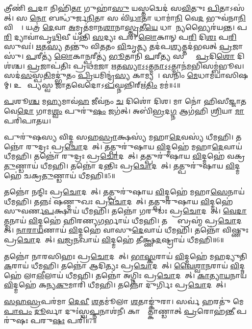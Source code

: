 𑌤𑍍𑌰𑍀𑌣𑌿॑ \ul{𑌪}𑌦𑌾 𑌨𑌿𑌹𑌿॑\ul{𑌤𑌾} 𑌗𑍁𑌹𑌾॑\ul{𑌸𑍁} 𑌯𑌸𑍍𑌤𑌦𑍍𑌵𑍇𑌦॑ 𑌸\ul{𑌵𑌿}𑌤𑍁𑌃 \ul{𑌪𑌿}𑌤𑌾𑌽𑌸॑𑌤𑍍। 
𑌸 \ul{𑌨𑍋} 𑌬𑌨𑍍𑌧𑍁॑𑌰𑍍𑌜\ul{𑌨𑌿}𑌤𑌾 𑌸 𑌵𑌿॑\ul{𑌧𑌾}𑌤𑌾 𑌧𑌾𑌮𑌾॑\ul{𑌨𑌿} 𑌵𑍇\ul{𑌦} 𑌭𑍁𑌵॑𑌨𑌾\ul{𑌨𑌿} 𑌵𑌿𑌶𑍍𑌵𑌾᳚। 
𑌯𑌤𑍍𑌰॑ \ul{𑌦𑍇}𑌵𑌾 \ul{𑌅}𑌮𑍃𑌤॑𑌮𑌾𑌨\ul{𑌶𑌾}𑌨𑌾\ul{𑌸𑍍𑌤𑍃}𑌤𑍀\ul{𑌯𑍇} 𑌧𑌾𑌮𑌾᳚\ul{𑌨𑍍𑌯}𑌭𑍍𑌯𑍈𑌰॑𑌯𑌨𑍍𑌤। 
𑌪\ul{𑌰𑌿} 𑌦𑍍𑌯𑌾𑌵𑌾॑𑌪𑍃\ul{𑌥𑌿}𑌵𑍀 𑌯॑𑌨𑍍𑌤𑌿 \ul{𑌸}𑌦𑍍𑌯𑌃 𑌪𑌰𑌿॑ \ul{𑌲𑍋}𑌕𑌾𑌨𑍍 𑌪\ul{𑌰𑌿} 𑌦𑌿\ul{𑌶𑌃} 𑌪\ul{𑌰𑌿} 𑌸𑍁𑌵𑌃॑। 
\ul{𑌋}𑌤\ul{𑌸𑍍𑌯} 𑌤𑌨𑍍𑌤𑍁𑌂॑ 𑌵𑌿𑌤𑌤𑌂 \ul{𑌵𑌿}𑌚𑍃\ul{𑌤𑍍𑌯} 𑌤𑌦॑𑌪\ul{𑌶𑍍𑌯}𑌤𑍍𑌤𑌦॑𑌭𑌵𑌤𑍍 \ul{𑌪𑍍𑌰}𑌜𑌾𑌸𑍁॑। 
\ul{𑌪}𑌰𑍀𑌤𑍍𑌯॑ \ul{𑌲𑍋}𑌕𑌾\ul{𑌨𑍍𑌪}𑌰𑍀𑌤𑍍𑌯॑ \ul{𑌭𑍂}𑌤𑌾𑌨𑌿॑ \ul{𑌪}𑌰𑍀\ul{𑌤𑍍𑌯} 𑌸𑌰𑍍𑌵𑌾𑌃᳚ \ul{𑌪𑍍𑌰}𑌦𑌿\ul{𑌶𑍋} 𑌦𑌿𑌶॑𑌶𑍍𑌚। 
\ul{𑌪𑍍𑌰}𑌜𑌾𑌪॑𑌤𑌿𑌃 𑌪𑍍𑌰𑌥\ul{𑌮}𑌜𑌾 \ul{𑌋}𑌤\ul{𑌸𑍍𑌯𑌾}𑌽॒𑌽॒𑌤𑍍𑌮\ul{𑌨𑌾}𑌽॒𑌽॒𑌤𑍍𑌮𑌾𑌨॑\ul{𑌮}𑌭𑌿𑌸𑌮𑍍𑌬॑𑌭𑍂𑌵। 
𑌸𑌦॑\ul{𑌸}𑌸𑍍𑌪\ul{𑌤𑌿}𑌮𑌦𑍍𑌭𑍁॑𑌤𑌂 \ul{𑌪𑍍𑌰𑌿}𑌯𑌮𑌿𑌨𑍍𑌦𑍍𑌰॑\ul{𑌸𑍍𑌯} 𑌕𑌾𑌮𑍍𑌯𑌮𑍍᳚। 
𑌸𑌨𑌿𑌂॑ \ul{𑌮𑍇}𑌧𑌾𑌮॑𑌯𑌾𑌸𑌿𑌷𑌮𑍍। 
𑌉𑌦𑍍𑌦𑍀᳚𑌪𑍍𑌯𑌸𑍍𑌵 𑌜𑌾𑌤𑌵𑍇𑌦𑍋𑌽\ul{𑌪}𑌘𑍍𑌨𑌨𑍍𑌨𑌿𑌰𑍍\mbox{}𑌋॑\ul{𑌤𑌿𑌂} 𑌮𑌮॑॥4॥

\ul{𑌪}𑌶𑍂\ul{𑌶𑍍𑌚} 𑌮\ul{𑌹𑍍𑌯}𑌮𑌾𑌵॑\ul{𑌹} 𑌜𑍀𑌵॑𑌨𑌂 \ul{𑌚} 𑌦𑌿𑌶𑍋॑ 𑌦𑌿𑌶। 
𑌮𑌾 𑌨𑍋॑ 𑌹𑌿𑌸𑍀𑌜𑍍𑌜𑌾𑌤𑌵𑍇\ul{𑌦𑍋} 𑌗𑌾𑌮\ul{𑌶𑍍𑌵𑌂} 𑌪𑍁𑌰𑍁॑\ul{𑌷𑌂} 𑌜𑌗॑𑌤𑍍। 
𑌅𑌬𑌿॑\ul{𑌭𑍍𑌰}𑌦\ul{𑌗𑍍𑌨} 𑌆𑌗॑𑌹𑌿 \ul{𑌶𑍍𑌰𑌿}𑌯𑌾 \ul{𑌮𑌾} 𑌪𑌰𑌿॑𑌪𑌾𑌤𑌯।


 𑌪𑍁𑌰𑍁॑𑌷𑌸𑍍𑌯 𑌵𑌿𑌦𑍍𑌮 𑌸𑌹\ul{𑌸𑍍𑌰𑌾}𑌕𑍍𑌷𑌸𑍍𑌯॑ 𑌮𑌹𑌾\ul{𑌦𑍇}𑌵𑌸𑍍𑌯॑ 𑌧𑍀𑌮𑌹𑌿। 
 𑌤𑌨𑍍𑌨𑍋॑ 𑌰𑍁𑌦𑍍𑌰𑌃 𑌪𑍍𑌰\ul{𑌚𑍋}𑌦𑌯𑌾᳚𑌤𑍍। 
 𑌤𑌤𑍍𑌪𑍁𑌰𑍁॑𑌷𑌾𑌯 \ul{𑌵𑌿}𑌦𑍍𑌮𑌹𑍇॑ 𑌮𑌹𑌾\ul{𑌦𑍇}𑌵𑌾𑌯॑ 𑌧𑍀𑌮𑌹𑌿। 
 𑌤𑌨𑍍𑌨𑍋॑ 𑌰𑍁𑌦𑍍𑌰𑌃 𑌪𑍍𑌰\ul{𑌚𑍋}𑌦𑌯𑌾᳚𑌤𑍍। 
 𑌤𑌤𑍍𑌪𑍁𑌰𑍁॑𑌷𑌾𑌯 \ul{𑌵𑌿}𑌦𑍍𑌮𑌹𑍇॑ 𑌵𑌕𑍍𑌰\ul{𑌤𑍁}𑌣𑍍𑌡𑌾𑌯॑ 𑌧𑍀𑌮𑌹𑌿। 
 𑌤𑌨𑍍𑌨𑍋॑ 𑌦𑌨𑍍𑌤𑌿𑌃 𑌪𑍍𑌰\ul{𑌚𑍋}𑌦𑌯𑌾᳚𑌤𑍍। 
 𑌤𑌤𑍍𑌪𑍁𑌰𑍁॑𑌷𑌾𑌯 \ul{𑌵𑌿}𑌦𑍍𑌮𑌹𑍇॑ 𑌚𑌕𑍍𑌰\ul{𑌤𑍁}𑌣𑍍𑌡𑌾𑌯॑ 𑌧𑍀𑌮𑌹𑌿॥5॥

 𑌤𑌨𑍍𑌨𑍋॑ 𑌨𑌨𑍍𑌦𑌿𑌃 𑌪𑍍𑌰\ul{𑌚𑍋}𑌦𑌯𑌾᳚𑌤𑍍। 
 𑌤𑌤𑍍𑌪𑍁𑌰𑍁॑𑌷𑌾𑌯 \ul{𑌵𑌿}𑌦𑍍𑌮𑌹𑍇॑ 𑌮𑌹𑌾\ul{𑌸𑍇}𑌨𑌾𑌯॑ 𑌧𑍀𑌮𑌹𑌿। 
 𑌤𑌨𑍍𑌨𑌃॑ 𑌷𑌣𑍍𑌮𑍁𑌖𑌃 𑌪𑍍𑌰\ul{𑌚𑍋}𑌦𑌯𑌾᳚𑌤𑍍। 
 𑌤𑌤𑍍𑌪𑍁𑌰𑍁॑𑌷𑌾𑌯 \ul{𑌵𑌿}𑌦𑍍𑌮𑌹𑍇॑ 𑌸𑍁𑌵𑌰𑍍𑌣\ul{𑌪}𑌕𑍍𑌷𑌾𑌯॑ 𑌧𑍀𑌮𑌹𑌿। 
 𑌤𑌨𑍍𑌨𑍋॑ 𑌗𑌰𑍁𑌡𑌃 𑌪𑍍𑌰\ul{𑌚𑍋}𑌦𑌯𑌾᳚𑌤𑍍। 
 \ul{𑌵𑍇}\ul{𑌦𑌾}\ul{𑌤𑍍𑌮}𑌨𑌾𑌯॑ \ul{𑌵𑌿}𑌦𑍍𑌮𑌹𑍇॑ 𑌹𑌿𑌰𑌣𑍍𑌯\ul{𑌗}𑌰𑍍𑌭𑌾𑌯॑ 𑌧𑍀𑌮𑌹𑌿। 
 𑌤𑌨𑍍𑌨𑍋᳚ 𑌬𑍍𑌰𑌹𑍍𑌮॑ 𑌪𑍍𑌰\ul{𑌚𑍋}𑌦𑌯𑌾᳚𑌤𑍍। 
 \ul{𑌨𑌾}\ul{𑌰𑌾}\ul{𑌯}𑌣𑌾𑌯॑ \ul{𑌵𑌿}𑌦𑍍𑌮𑌹𑍇॑ 𑌵𑌾𑌸𑍁\ul{𑌦𑍇}𑌵𑌾𑌯॑ 𑌧𑍀𑌮𑌹𑌿। 
 𑌤𑌨𑍍𑌨𑍋॑ 𑌵𑌿𑌷𑍍𑌣𑍁𑌃 𑌪𑍍𑌰\ul{𑌚𑍋}𑌦𑌯𑌾᳚𑌤𑍍। 
 \ul{𑌵}\ul{𑌜𑍍𑌰}\ul{𑌨}𑌖𑌾𑌯॑ \ul{𑌵𑌿}𑌦𑍍𑌮𑌹𑍇॑ 𑌤𑍀𑌕𑍍𑌷𑍍𑌣\ul{𑌦}\ul{}𑌷𑍍𑌟𑍍𑌰𑌾𑌯॑ 𑌧𑍀𑌮𑌹𑌿॥6॥
 
𑌤𑌨𑍍𑌨𑍋॑ 𑌨𑌾𑌰𑌸𑌿𑌹𑌃 𑌪𑍍𑌰\ul{𑌚𑍋}𑌦𑌯𑌾᳚𑌤𑍍। 
\ul{𑌭𑌾}\ul{𑌸𑍍𑌕}𑌰𑌾𑌯॑ \ul{𑌵𑌿}𑌦𑍍𑌮𑌹𑍇॑ 𑌮𑌹𑌦𑍍𑌯𑍁𑌤𑌿\ul{𑌕}𑌰𑌾𑌯॑ 𑌧𑍀𑌮𑌹𑌿। 
𑌤𑌨𑍍𑌨𑍋॑ 𑌆𑌦𑌿𑌤𑍍𑌯𑌃 𑌪𑍍𑌰\ul{𑌚𑍋}𑌦𑌯𑌾᳚𑌤𑍍। 
\ul{𑌵𑍈}\ul{𑌶𑍍𑌵𑌾}\ul{𑌨}𑌰𑌾𑌯॑ \ul{𑌵𑌿}𑌦𑍍𑌮𑌹𑍇॑ 𑌲𑌾\ul{𑌲𑍀}𑌲𑌾𑌯॑ 𑌧𑍀𑌮𑌹𑌿। 
𑌤𑌨𑍍𑌨𑍋॑ 𑌅𑌗𑍍𑌨𑌿𑌃 𑌪𑍍𑌰\ul{𑌚𑍋}𑌦𑌯𑌾᳚𑌤𑍍। 
\ul{𑌕𑌾}\ul{𑌤𑍍𑌯𑌾}\ul{𑌯}𑌨𑌾𑌯॑ \ul{𑌵𑌿}𑌦𑍍𑌮𑌹𑍇॑ 𑌕𑌨𑍍𑌯\ul{𑌕𑍁}𑌮𑌾𑌰𑌿॑ 𑌧𑍀𑌮𑌹𑌿। 
𑌤𑌨𑍍𑌨𑍋॑ 𑌦𑍁𑌰𑍍𑌗𑌿𑌃 𑌪𑍍𑌰\ul{𑌚𑍋}𑌦𑌯𑌾᳚𑌤𑍍। 


\ul{𑌸}\ul{𑌹}\ul{𑌸𑍍𑌰}𑌪𑌰॑𑌮𑌾 \ul{𑌦𑍇}\ul{𑌵𑍀} \ul{𑌶}𑌤𑌮𑍂॑𑌲𑌾 \ul{𑌶}𑌤𑌾𑌙𑍍𑌕𑍁॑𑌰𑌾। 
𑌸𑌰𑍍𑌵॑ 𑌹𑌰𑌤𑍁॑ 𑌮𑍇 \ul{𑌪𑌾}\ul{𑌪𑌂} \ul{𑌦𑍂}𑌰𑍍𑌵𑌾 𑌦𑍁𑌃॑𑌸𑍍𑌵\ul{𑌪𑍍𑌨}𑌨𑌾𑌶॑𑌨𑍀। 
𑌕𑌾𑌣𑍍𑌡𑌾᳚𑌤𑍍𑌕𑌾𑌣𑍍𑌡𑌾𑌤𑍍 \ul{𑌪𑍍𑌰}𑌰𑍋𑌹॑\ul{𑌨𑍍𑌤𑍀} 𑌪𑌰𑍁॑𑌷𑌃 𑌪𑌰𑍁\ul{𑌷𑌃} 𑌪𑌰𑌿॑॥7॥

